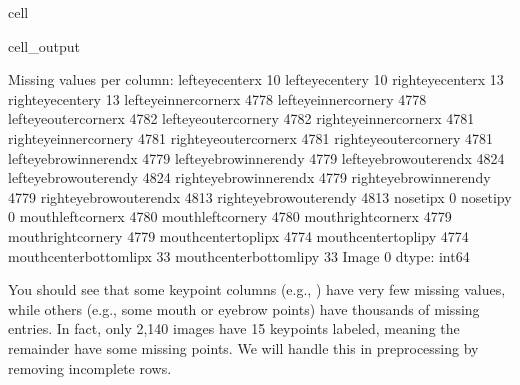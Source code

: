 \documentclass[letterpaper,10pt,english]{jupyterBook}
\begin{document}
\begin{sphinxuseclass}{cell}
\begin{sphinxVerbatimOutput}
\begin{sphinxuseclass}{cell_output}
\begin{sphinxVerbatim}[commandchars=\\\{\}]
Missing values per column:
left\PYGZus{}eye\PYGZus{}center\PYGZus{}x              10
left\PYGZus{}eye\PYGZus{}center\PYGZus{}y              10
right\PYGZus{}eye\PYGZus{}center\PYGZus{}x             13
right\PYGZus{}eye\PYGZus{}center\PYGZus{}y             13
left\PYGZus{}eye\PYGZus{}inner\PYGZus{}corner\PYGZus{}x      4778
left\PYGZus{}eye\PYGZus{}inner\PYGZus{}corner\PYGZus{}y      4778
left\PYGZus{}eye\PYGZus{}outer\PYGZus{}corner\PYGZus{}x      4782
left\PYGZus{}eye\PYGZus{}outer\PYGZus{}corner\PYGZus{}y      4782
right\PYGZus{}eye\PYGZus{}inner\PYGZus{}corner\PYGZus{}x     4781
right\PYGZus{}eye\PYGZus{}inner\PYGZus{}corner\PYGZus{}y     4781
right\PYGZus{}eye\PYGZus{}outer\PYGZus{}corner\PYGZus{}x     4781
right\PYGZus{}eye\PYGZus{}outer\PYGZus{}corner\PYGZus{}y     4781
left\PYGZus{}eyebrow\PYGZus{}inner\PYGZus{}end\PYGZus{}x     4779
left\PYGZus{}eyebrow\PYGZus{}inner\PYGZus{}end\PYGZus{}y     4779
left\PYGZus{}eyebrow\PYGZus{}outer\PYGZus{}end\PYGZus{}x     4824
left\PYGZus{}eyebrow\PYGZus{}outer\PYGZus{}end\PYGZus{}y     4824
right\PYGZus{}eyebrow\PYGZus{}inner\PYGZus{}end\PYGZus{}x    4779
right\PYGZus{}eyebrow\PYGZus{}inner\PYGZus{}end\PYGZus{}y    4779
right\PYGZus{}eyebrow\PYGZus{}outer\PYGZus{}end\PYGZus{}x    4813
right\PYGZus{}eyebrow\PYGZus{}outer\PYGZus{}end\PYGZus{}y    4813
nose\PYGZus{}tip\PYGZus{}x                      0
nose\PYGZus{}tip\PYGZus{}y                      0
mouth\PYGZus{}left\PYGZus{}corner\PYGZus{}x          4780
mouth\PYGZus{}left\PYGZus{}corner\PYGZus{}y          4780
mouth\PYGZus{}right\PYGZus{}corner\PYGZus{}x         4779
mouth\PYGZus{}right\PYGZus{}corner\PYGZus{}y         4779
mouth\PYGZus{}center\PYGZus{}top\PYGZus{}lip\PYGZus{}x       4774
mouth\PYGZus{}center\PYGZus{}top\PYGZus{}lip\PYGZus{}y       4774
mouth\PYGZus{}center\PYGZus{}bottom\PYGZus{}lip\PYGZus{}x      33
mouth\PYGZus{}center\PYGZus{}bottom\PYGZus{}lip\PYGZus{}y      33
Image                           0
dtype: int64
\end{sphinxVerbatim}

\end{sphinxuseclass}\end{sphinxVerbatimOutput}

\end{sphinxuseclass}
\sphinxAtStartPar
You should see that some keypoint columns (e.g., ) have very few missing values, while others (e.g., some mouth or eyebrow points) have thousands of missing entries. In fact, only 2,140 images have  15 keypoints labeled, meaning the remainder have some missing points. We will handle this in preprocessing by removing incomplete rows.
\end{document}
